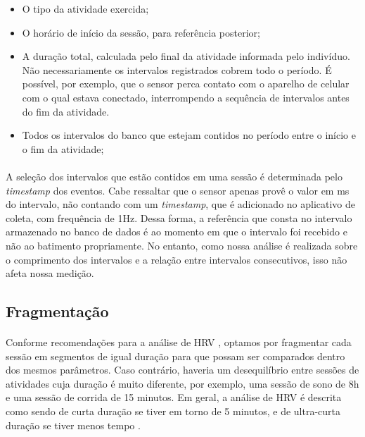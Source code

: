             \begin{itemize}
                \item O tipo da atividade exercida;
                \item O horário de início da sessão, para referência posterior;
                \item A duração total, calculada pelo final da atividade informada pelo indivíduo. Não necessariamente os intervalos registrados cobrem todo o período. É possível, por exemplo, que o sensor perca contato com o aparelho de celular com o qual estava conectado, interrompendo a sequência de intervalos antes do fim da atividade.
                \item Todos os intervalos do banco que estejam contidos no período entre o início e o fim da atividade;
            \end{itemize} 
            
            \paragraph{} A seleção dos intervalos que estão contidos em uma sessão é determinada pelo \textit{timestamp} dos eventos. Cabe ressaltar que o sensor apenas provê o valor em ms do intervalo, não contando com um \textit{timestamp}, que é adicionado no aplicativo de coleta, com frequência de 1Hz. Dessa forma, a referência que consta no intervalo armazenado no banco de dados é ao momento em que o intervalo foi recebido e não ao batimento propriamente. No entanto, como nossa análise é realizada sobre o comprimento dos intervalos e a relação entre intervalos consecutivos, isso não afeta nossa medição.
            
            
            
        \subsection{Fragmentação} \label{fragdesc}
        
            \paragraph{} Conforme recomendações para a análise de HRV \cite{Quintana2016GuidelinesCommunication}, optamos por fragmentar cada sessão em segmentos de igual duração para que possam ser comparados dentro dos mesmos parâmetros. Caso contrário, haveria um desequilíbrio entre sessões de atividades cuja duração é muito diferente, por exemplo, uma sessão de sono de 8h e uma sessão de corrida de 15 minutos. Em geral, a análise de HRV é descrita como sendo de curta duração se tiver em torno de 5 minutos, e de ultra-curta duração se tiver menos tempo \cite{TaskForceoftheEuropeanSocietyofCardiologytheNorthAmericanSocietyofPacing1996HeartUse, Shaffer2017AnNorms.}.
            
